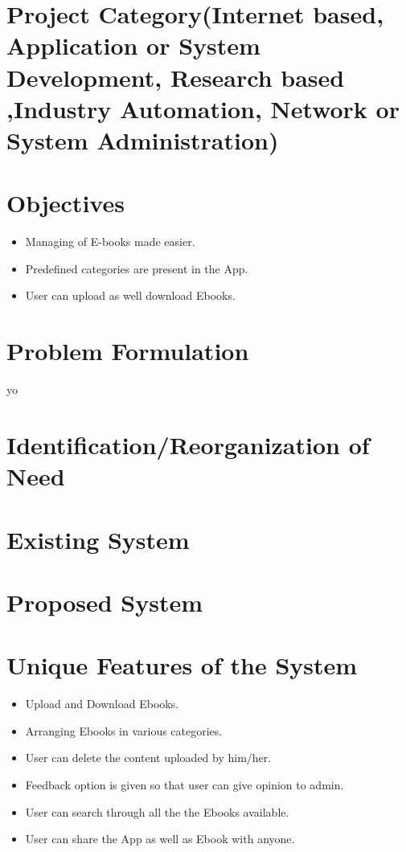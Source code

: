\section{Project Category(Internet based, Application or System Development, Research based ,Industry Automation, Network or System Administration)}

\section{Objectives}

\begin{itemize}
	\item Managing of E-books made easier.

	\item Predefined categories are present in the App.
	
	\item User can upload as well download Ebooks.


\end{itemize}

\section{Problem Formulation}
yo

\section{Identification/Reorganization of Need}

\section{Existing System}

\section{Proposed System}

\section{Unique Features of the System}
\begin{itemize}

\item Upload and Download Ebooks.
\item Arranging Ebooks in various categories.
\item User can delete the content uploaded by him/her.
\item Feedback option is given so that user can give opinion to admin.
\item User can search through all the the Ebooks available.
\item User can share the App as well as Ebook with anyone. 
\end{itemize}


